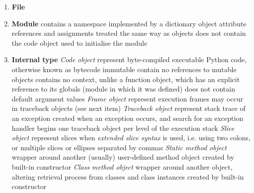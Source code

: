 \documentclass{icldt}
\numberwithin{equation}{section}       %
\begin{document}
{{\begin{enumerate}
		\subitem \emph{Class instance}
			\subsubitem created by calling a class object
	\item \textbf{File}
	\item \textbf{Module}
		\subitem contains a namespace implemented by a dictionary object
		\subitem attribute references and assignments treated the same way as objects
		\subitem does not contain the code object used to initialise the module
	\item \textbf{Internal type}
		\subitem \emph{Code object}
			\subsubitem represent byte-compiled executable Python code, otherwise known as bytecode
			\subsubitem immutable
			\subsubitem contain no references to mutable objects
			\subsubitem contains no context, unlike a function object, which has an explicit reference to its globals (module in which it was defined)
			\subsubitem does not contain default argument values
		\subitem \emph{Frame object}
			\subsubitem represent execution frames
			\subsubitem may occur in traceback objects (see next item)
		\subitem \emph{Traceback object}
			\subsubitem represent stack trace of an exception
			\subsubitem created when an exception occurs, and search for an exception handler begins
			\subsubitem one traceback object per level of the execution stack
		\subitem \emph{Slice object}
			\subsubitem represent slices when \emph{extended slice syntax} is used, i.e. using two colons, or multiple slices or ellipses separated by commas
		\subitem \emph{Static method object}
			\subsubitem wrapper around another (usually) user-defined method object
			\subsubitem created by built-in  constructor
		\subitem \emph{Class method object}
			\subsubitem wrapper around another object, altering retrieval process from classes and class instances
			\subsubitem created by built-in  constructor
\end{enumerate}

}}
\end{document}

